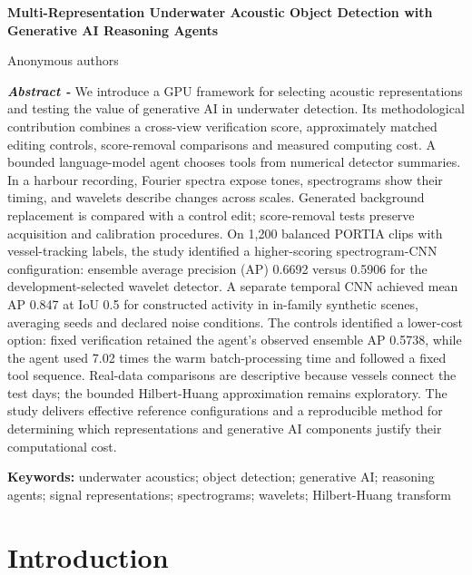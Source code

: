 \documentclass[11pt,letterpaper]{article}
\newcommand{\drafttitle}[1]{\begin{center}\sffamily\bfseries\fontsize{16}{19}\selectfont #1\end{center}}
\begin{document}
\fontsize{11}{13}\selectfont

\nocite{portia,signals1,signals2,uabench,physicsgen,huang1998,flowmatching,qwen,waveletship,uniqueship,speechocean,wav2vec2}

\drafttitle{Multi-Representation Underwater Acoustic Object Detection with Generative AI Reasoning Agents}

\begin{center}Anonymous authors\end{center}

{\fontsize{10}{11.5}\selectfont\noindent \textbf{\textit{Abstract - }}We introduce a GPU framework for selecting acoustic representations and testing the value of generative AI in underwater detection. Its methodological contribution combines a cross-view verification score, approximately matched editing controls, score-removal comparisons and measured computing cost. A bounded language-model agent chooses tools from numerical detector summaries. In a harbour recording, Fourier spectra expose tones, spectrograms show their timing, and wavelets describe changes across scales. Generated background replacement is compared with a control edit; score-removal tests preserve acquisition and calibration procedures. On 1,200 balanced PORTIA clips with vessel-tracking labels, the study identified a higher-scoring spectrogram-CNN configuration: ensemble average precision (AP) 0.6692 versus 0.5906 for the development-selected wavelet detector. A separate temporal CNN achieved mean AP 0.847 at IoU 0.5 for constructed activity in in-family synthetic scenes, averaging seeds and declared noise conditions. The controls identified a lower-cost option: fixed verification retained the agent's observed ensemble AP 0.5738, while the agent used 7.02 times the warm batch-processing time and followed a fixed tool sequence. Real-data comparisons are descriptive because vessels connect the test days; the bounded Hilbert-Huang approximation remains exploratory. The study delivers effective reference configurations and a reproducible method for determining which representations and generative AI components justify their computational cost.\par}

{\fontsize{9}{11}\selectfont\noindent \textbf{Keywords:} underwater acoustics; object detection; generative AI; reasoning agents; signal representations; spectrograms; wavelets; Hilbert-Huang transform\par}

\section{Introduction}
\end{document}
